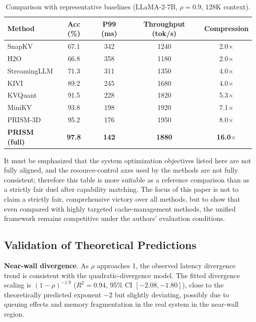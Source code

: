 \documentclass[11pt,a4paper]{article}
\theoremstyle{plain}
\theoremstyle{definition}
\begin{document}
\begin{table}[htbp]
\centering
\caption{Comparison with representative baselines (LLaMA-2-7B, $\rho=0.9$, 128K context).}
\label{tab:baselines}
\begin{tabular}{lcccc}
\toprule
\textbf{Method} & \textbf{Acc (\%)} & \textbf{P99 (ms)} & \textbf{Throughput (tok/s)} & \textbf{Compression} \\
\midrule
SnapKV & 67.1 & 342 & 1240 & 2.0$\times$ \\
H2O & 66.8 & 358 & 1180 & 2.0$\times$ \\
StreamingLLM & 71.3 & 311 & 1350 & 4.0$\times$ \\
KIVI & 89.2 & 245 & 1680 & 4.0$\times$ \\
KVQuant & 91.5 & 228 & 1820 & 5.3$\times$ \\
MiniKV & 93.8 & 198 & 1920 & 7.1$\times$ \\
PRISM-3D & 95.2 & 176 & 1950 & 8.0$\times$ \\
\textbf{PRISM (full)} & \textbf{97.8} & \textbf{142} & \textbf{1880} & \textbf{16.0$\times$} \\
\bottomrule
\end{tabular}
\end{table}

It must be emphasized that the system optimization objectives listed here are not fully aligned, and the resource-control axes used by the methods are not fully consistent; therefore this table is more suitable as a reference comparison than as a strictly fair duel after capability matching. The focus of this paper is not to claim a strictly fair, comprehensive victory over all methods, but to show that even compared with highly targeted cache-management methods, the unified framework remains competitive under the authors' evaluation conditions.

\subsection{Validation of Theoretical Predictions}

\textbf{Near-wall divergence}. As $\rho$ approaches 1, the observed latency divergence trend is consistent with the quadratic-divergence model. The fitted divergence scaling is $(1-\rho)^{-1.9}$ ($R^2=0.94$, 95\% CI $[-2.08, -1.80]$), close to the theoretically predicted exponent $-2$ but slightly deviating, possibly due to queuing effects and memory fragmentation in the real system in the near-wall region.
\end{document}
